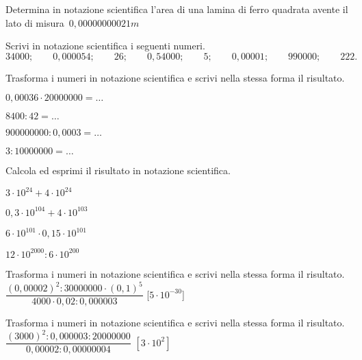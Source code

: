 \begin{esercizio}
 \label{ese:3.63}
Determina in notazione scientifica l'area di una lamina di ferro quadrata
avente il lato di misura~$0,00000000021\unit{m}$
\end{esercizio}

\begin{esercizio}
 \label{ese:3.64}
Scrivi in notazione scientifica i seguenti numeri.
\[34000;\qquad0,000054;\qquad26;\qquad0,54000;\qquad5;\qquad0,00001;
\qquad990000;\qquad222.\]
\end{esercizio}

\begin{esercizio}
 \label{ese:3.65}
Trasforma i numeri in notazione scientifica e scrivi nella stessa forma il 
risultato.
\begin{multicols}{2}
\begin{enumeratea}
\item $0,00036\cdot20000000=\ldots$
\item $8400:42=\ldots$
\item $900000000:0,0003=\ldots$
\item $3:10000000=\ldots$
\end{enumeratea}
\end{multicols}
\end{esercizio}
\clearpage
\begin{esercizio}
 \label{ese:3.66}
Calcola ed esprimi il risultato in notazione scientifica.
\begin{multicols}{2}
\begin{enumeratea}
\item $3\cdot10^{24} +4\cdot10^{24}$
\item $0,3\cdot10^{104} +4\cdot10^{103}$
\item $6\cdot10^{101}\cdot0,15\cdot10^{101}$
\item $12\cdot10^{2000}:6\cdot10^{200}$
\end{enumeratea}
\end{multicols}
\end{esercizio}

\begin{esercizio}[\Ast]
 \label{ese:3.67}
Trasforma i numeri in notazione scientifica e scrivi nella stessa forma il 
risultato.
\(\dfrac{(0,00002)^2:30000000\cdot(0,1)^5}{4000 \cdot0,02:0,000003}\)
\hfill [\(5\cdot10^{-30}\)]
\end{esercizio}

\begin{esercizio}[\Ast]
 \label{ese:3.68}
Trasforma i numeri in notazione scientifica e scrivi nella stessa forma il 
risultato.
\(\dfrac{(3000)^2:0,000003:20000000}{0,00002:0,00000004}\)
\hfill \(\left[3\cdot10^2 \right]\)
\end{esercizio}

